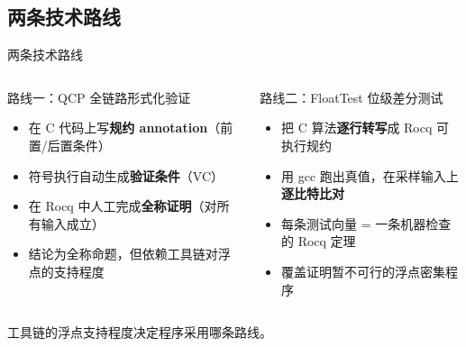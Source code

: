 \documentclass[UTF8,aspectratio=169]{ctexbeamer}
\begin{document}
\subsection{两条技术路线}
\begin{frame}{两条技术路线}
  \begin{columns}[T]
    \begin{block}{路线一：QCP 全链路形式化验证}
      \begin{itemize}\small
        \item 在 C 代码上写\textbf{规约 annotation}（前置/后置条件）
        \item 符号执行自动生成\textbf{验证条件}（VC）
        \item 在 Rocq 中人工完成\textbf{全称证明}（对所有输入成立）
        \item 结论为全称命题，但依赖工具链对浮点的支持程度
      \end{itemize}
    \end{block}
    \begin{block}{路线二：FloatTest 位级差分测试}
      \begin{itemize}\small
        \item 把 C 算法\textbf{逐行转写}成 Rocq 可执行规约
        \item 用 gcc 跑出真值，在采样输入上\textbf{逐比特比对}
        \item 每条测试向量 = 一条机器检查的 Rocq 定理
        \item 覆盖证明暂不可行的浮点密集程序
      \end{itemize}
    \end{block}
  \end{columns}
  \vspace{0.8em}
  \centering\small
  工具链的浮点支持程度决定程序采用哪条路线。
\end{frame}
\end{document}
